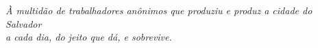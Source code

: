 \begin{dedicatoria}
   \vspace*{\fill}
   \centering
   \noindent
   \textit{À multidão de trabalhadores anônimos que produziu e produz a cidade do Salvador \\ a cada dia, do jeito que dá, e sobrevive.} \vspace*{\fill}
\end{dedicatoria}
